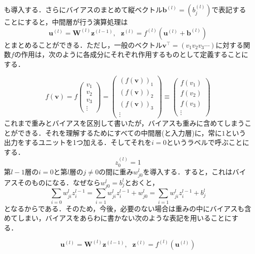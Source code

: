 \documentclass[a4paper,11pt]{jsreport}
\begin{document}
も導入する．さらにバイアスのまとめて縦ベクトル$\bm{b}^{(l)} = \left( b_j^{(l)} \right)$で表記することにすると，中間層が行う演算処理は
\begin{equation}
  \bm{u}^{(l)}
  = \bm{W}^{(l)} \bm{z}^{(l-1)}, \ \ \ \bm{z}^{(l)} = f^{(l)}\left( \bm{u}^{(l)} + \bm{b}^{(l)} \right)
\end{equation}
とまとめることができる．ただし，一般のベクトル$\bm{v}^{\top} = (v_1 v_2 v_3 \cdots)$に対する関数$f$の作用は，次のように各成分にそれぞれ作用するものとして定義することにする．\par
\begin{equation}
  f(\bm{v}) = f\begin{pmatrix}
    v_1 \\ v_2 \\ v_3 \\ \vdots
  \end{pmatrix} = \begin{pmatrix}
    (f(\bm{v}))_1 \\ (f(\bm{v}))_2 \\ (f(\bm{v}))_3 \\ \vdots
  \end{pmatrix} \equiv \begin{pmatrix}
    f(v_1) \\ f(v_2) \\ f(v_3) \\ \vdots
  \end{pmatrix}
\end{equation}
これまで重みとバイアスを区別して書いたが，バイアスも重みに含めてしまうことができる．それを理解するためにすべての中間層(と入力層)に，常に$1$という出力をするユニットを1つ加える．そしてそれを$i=0$というラベルで呼ぶことにする．
\begin{equation}
  z_0^{(l)} = 1
\end{equation}
第$l-1$層の$i=0$と第$l$層の$j \neq 0$の間に重み$w_{j0}^{l}$を導入する．すると，これはバイアスそのものになる．なぜなら$w_{j0}^l = b_j^l$とおくと，
\begin{equation}
  \sum_{i=0} w_{ji}^l z_i^{l-1}
  = \sum_{i=1} w_{ji}^l z_i^{l-1} + w_{j0}^l
  = \sum_{i=1} w_{ji}^l z_i^{l-1} + b_j^l
\end{equation}
となるからである．そのため，今後，必要のない場合は重みの中にバイアスも含めてしまい，バイアスをあらわに書かない次のような表記を用いることにする．\par
\begin{equation}
  \bm{u}^{(l)}
  = \bm{W}^{(l)} \bm{z}^{(l-1)}, \ \ \ \bm{z}^{(l)} = f^{(l)}\left( \bm{u}^{(l)} \right)
\end{equation}
\end{document}
